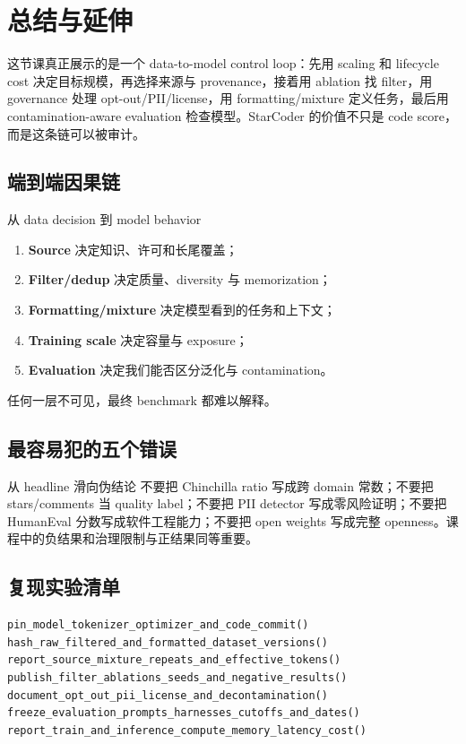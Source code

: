 \section{总结与延伸}

这节课真正展示的是一个 data-to-model control loop：先用 scaling 和 lifecycle cost 决定目标规模，再选择来源与 provenance，接着用 ablation 找 filter，用 governance 处理 opt-out/PII/license，用 formatting/mixture 定义任务，最后用 contamination-aware evaluation 检查模型。StarCoder 的价值不只是 code score，而是这条链可以被审计。

\subsection{端到端因果链}

\begin{importantbox}{从 data decision 到 model behavior}
\begin{enumerate}
  \item \textbf{Source} 决定知识、许可和长尾覆盖；
  \item \textbf{Filter/dedup} 决定质量、diversity 与 memorization；
  \item \textbf{Formatting/mixture} 决定模型看到的任务和上下文；
  \item \textbf{Training scale} 决定容量与 exposure；
  \item \textbf{Evaluation} 决定我们能否区分泛化与 contamination。
\end{enumerate}
任何一层不可见，最终 benchmark 都难以解释。
\end{importantbox}

\subsection{最容易犯的五个错误}

\begin{warningbox}{从 headline 滑向伪结论}
不要把 Chinchilla ratio 写成跨 domain 常数；不要把 stars/comments 当 quality label；不要把 PII detector 写成零风险证明；不要把 HumanEval 分数写成软件工程能力；不要把 open weights 写成完整 openness。课程中的负结果和治理限制与正结果同等重要。
\end{warningbox}

\subsection{复现实验清单}

\begin{lstlisting}[caption={预训练项目的统一复现清单}]
pin_model_tokenizer_optimizer_and_code_commit()
hash_raw_filtered_and_formatted_dataset_versions()
report_source_mixture_repeats_and_effective_tokens()
publish_filter_ablations_seeds_and_negative_results()
document_opt_out_pii_license_and_decontamination()
freeze_evaluation_prompts_harnesses_cutoffs_and_dates()
report_train_and_inference_compute_memory_latency_cost()
\end{lstlisting}

